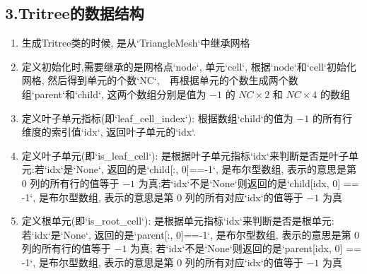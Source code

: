 \documentclass{article}
\begin{document}
\subsection{3.Tritree的数据结构}
\begin{enumerate}
\item 生成Tritree类的时候, 是从`TriangleMesh`中继承网格
\item 定义初始化时,需要继承的是网格点`node`, 单元`cell`, 根据`node`和`cell`初始化网格, 然后得到单元的个数`NC`,　再根据单元的个数生成两个数组`parent`和`child`, 这两个数组分别是值为 $-1$ 的 $NC \times 2$ 和 $NC \times 4$ 的数组
\item 定义叶子单元指标(即`leaf\_cell\_index`): 根据数组`child`的值为 $-1$ 的所有行维度的索引值`idx`, 返回叶子单元的`idx`.
\item 定义叶子单元(即`is\_leaf\_cell`): 是根据叶子单元指标`idx`来判断是否是叶子单元:若`idx`是`None`, 返回的是`child[:, 0]==-1`, 是布尔型数组, 表示的意思是第 $0$ 列的所有行的值等于 $-1$ 为真;若`idx`不是`None`则返回的是`child[idx, 0] == -1`, 是布尔型数组, 表示的意思是第 $0$ 列的所有对应`idx`的值等于 $-1$ 为真
\item 定义根单元(即`is\_root\_cell`): 是根据单元指标`idx`来判断是否是根单元: 若`idx`是`None`, 返回的是`parent[:, 0]==-1`, 是布尔型数组, 表示的意思是第 $0$ 列的所有行的值等于 $-1$ 为真; 若`idx`不是`None`则返回的是`parent[idx, 0] == -1`, 是布尔型数组, 表示的意思是第 $0$ 列的所有对应`idx`的值等于 $-1$ 为真
\end{enumerate}
\end{document}

